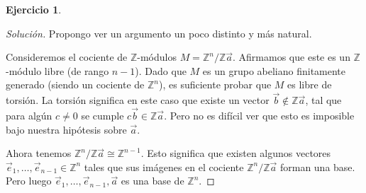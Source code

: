 \documentclass{article}
\newcounter{tarea}
\theoremstyle{definition}
\newtheorem{ejercicio}{Ejercicio}[tarea]
\newenvironment{solucion}{\begin{proof}[Solución]}{\end{proof}}
\newcommand{\ZZ}{\mathbb{Z}}
\begin{document}
\begin{ejercicio}
\begin{solucion}
    \pagebreak

    Propongo ver un argumento un poco distinto y más natural.

    Consideremos el cociente de $\ZZ$-módulos $M = \ZZ^n/\ZZ\vec{a}$. Afirmamos
    que este es un $\ZZ$-módulo libre (de rango $n-1$). Dado que $M$ es un grupo
    abeliano finitamente generado (siendo un cociente de $\ZZ^n$), es suficiente
    probar que $M$ es libre de torsión. La torsión significa en este caso que
    existe un vector $\vec{b} \notin \ZZ \vec{a}$, tal que para algún $c \ne 0$
    se cumple $c \vec{b} \in \ZZ \vec{a}$. Pero no es difícil ver que esto es
    imposible bajo nuestra hipótesis sobre $\vec{a}$.

    Ahora tenemos $\ZZ^n/\ZZ\vec{a} \cong \ZZ^{n-1}$. Esto significa que existen
    algunos vectores $\vec{e}_1, \ldots, \vec{e}_{n-1} \in \ZZ^n$ tales que sus
    imágenes en el cociente $\ZZ^n/\ZZ\vec{a}$ forman una base. Pero luego
    $\vec{e}_1, \ldots, \vec{e}_{n-1}, \vec{a}$ es una base de $\ZZ^n$.
  \end{solucion}
  \fi
\end{ejercicio}
\end{document}
